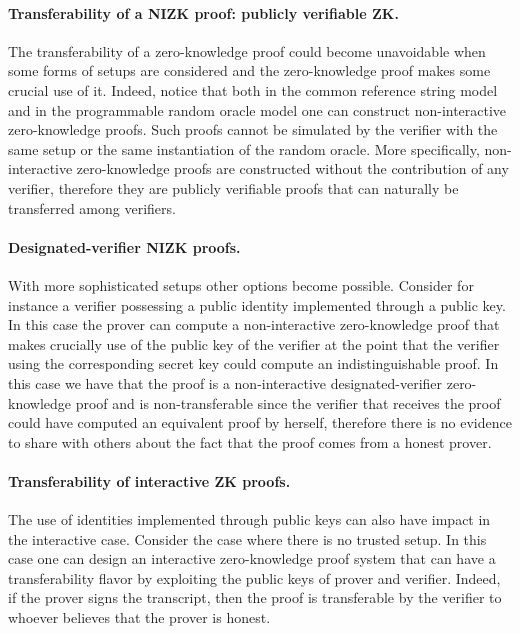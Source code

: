 \paragraph{Transferability of a NIZK proof: publicly verifiable ZK.}
The transferability of a zero-knowledge proof could become unavoidable when some forms of setups are considered and the zero-knowledge proof makes some crucial use of it. 
Indeed, notice that both in the common reference string model and in the programmable random oracle model one can construct non-interactive zero-knowledge proofs. 
Such proofs cannot be simulated by the verifier with the same setup or the same instantiation of the random oracle. 
More specifically, non-interactive zero-knowledge proofs are constructed without the contribution of any verifier, therefore they are publicly verifiable proofs that can naturally be transferred among verifiers.


\paragraph{Designated-verifier NIZK proofs.}
With more sophisticated setups other options become possible. 
Consider for instance a verifier possessing a public identity implemented through a public key. 
In this case the prover can compute a non-interactive zero-knowledge proof that makes crucially use of the public key of the verifier at the point that the verifier using the corresponding secret key could compute an indistinguishable proof. 
In this case we have that the proof is a non-interactive designated-verifier zero-knowledge proof and is non-transferable since the verifier that receives the proof could have computed an equivalent proof by herself, therefore there is no evidence to share with others about the fact that the proof comes from a honest prover. 


\paragraph{Transferability of interactive ZK proofs.} 
The use of identities implemented through public keys can also have impact in the interactive case. 
Consider the case where there is no trusted setup. 
In this case one can design an interactive zero-knowledge proof system that can have a transferability flavor by exploiting the public keys of prover and verifier. 
Indeed, if the prover signs the transcript, then the proof is transferable by the verifier to whoever believes that the prover is honest.
